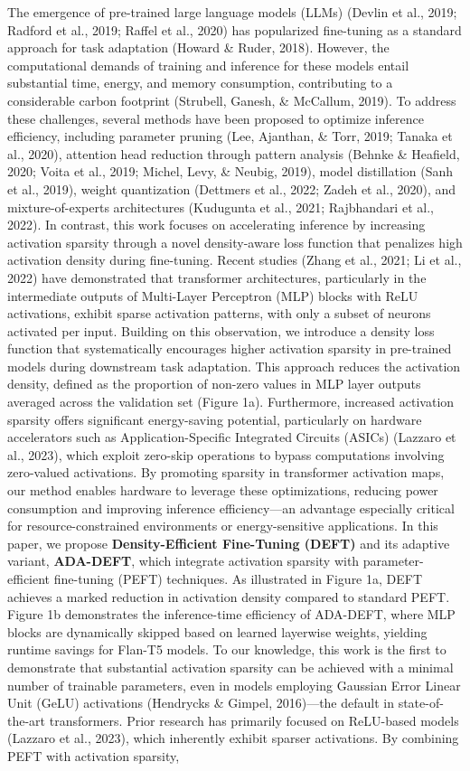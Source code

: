 \documentclass[10pt,twocolumn]{article}
\begin{document}
The emergence of pre-trained large language models (LLMs) (Devlin et al., 2019; Radford et al., 2019; Raffel et al., 2020) has popularized fine-tuning as a standard approach for task adaptation (Howard \& Ruder, 2018). However, the computational demands of training and inference for these models entail substantial time, energy, and memory consumption, contributing to a considerable carbon footprint (Strubell, Ganesh, \& McCallum, 2019). To address these challenges, several methods have been proposed to optimize inference efficiency, including parameter pruning (Lee, Ajanthan, \& Torr, 2019; Tanaka et al., 2020), attention head reduction through pattern analysis (Behnke \& Heafield, 2020; Voita et al., 2019; Michel, Levy, \& Neubig, 2019), model distillation (Sanh et al., 2019), weight quantization (Dettmers et al., 2022; Zadeh et al., 2020), and mixture-of-experts architectures (Kudugunta et al., 2021; Rajbhandari et al., 2022). In contrast, this work focuses on accelerating inference by increasing activation sparsity through a novel density-aware loss function that penalizes high activation density during fine-tuning. Recent studies (Zhang et al., 2021; Li et al., 2022) have demonstrated that transformer architectures, particularly in the intermediate outputs of Multi-Layer Perceptron (MLP) blocks with ReLU activations, exhibit sparse activation patterns, with only a subset of neurons activated per input. Building on this observation, we introduce a density loss function that systematically encourages higher activation sparsity in pre-trained models during downstream task adaptation. This approach reduces the activation density, defined as the proportion of non-zero values in MLP layer outputs averaged across the validation set (Figure 1a). Furthermore, increased activation sparsity offers significant energy-saving potential, particularly on hardware accelerators such as Application-Specific Integrated Circuits (ASICs) (Lazzaro et al., 2023), which exploit zero-skip operations to bypass computations involving zero-valued activations. By promoting sparsity in transformer activation maps, our method enables hardware to leverage these optimizations, reducing power consumption and improving inference efficiency—an advantage especially critical for resource-constrained environments or energy-sensitive applications. In this paper, we propose \textbf{Density-Efficient Fine-Tuning (DEFT)} and its adaptive variant, \textbf{ADA-DEFT}, which integrate activation sparsity with parameter-efficient fine-tuning (PEFT) techniques. As illustrated in Figure 1a, DEFT achieves a marked reduction in activation density compared to standard PEFT. Figure 1b demonstrates the inference-time efficiency of ADA-DEFT, where MLP blocks are dynamically skipped based on learned layerwise weights, yielding runtime savings for Flan-T5 models. To our knowledge, this work is the first to demonstrate that substantial activation sparsity can be achieved with a minimal number of trainable parameters, even in models employing Gaussian Error Linear Unit (GeLU) activations (Hendrycks \& Gimpel, 2016)—the default in state-of-the-art transformers. Prior research has primarily focused on ReLU-based models (Lazzaro et al., 2023), which inherently exhibit sparser activations. By combining PEFT with activation sparsity, 
\end{document}
